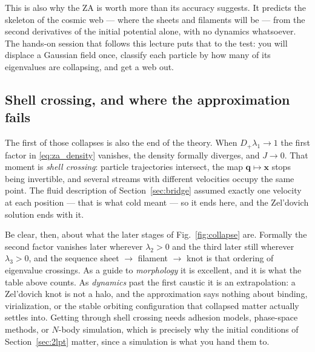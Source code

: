 \documentclass[a4paper,11pt]{article}
\newcommand{\vx}{\bm{x}}
\newcommand{\vq}{\bm{q}}
\numberwithin{equation}{section}
\begin{document}
This is also why the ZA is worth more than its accuracy suggests. It predicts the
skeleton of the cosmic web --- where the sheets and filaments will be --- from
the second derivatives of the initial potential alone, with no dynamics
whatsoever. The hands-on session that follows this lecture puts that to the test:
you will displace a Gaussian field once, classify each particle by how many of its
eigenvalues are collapsing, and get a web out.

\subsection{Shell crossing, and where the approximation fails}
\label{sec:shellcross}

The first of those collapses is also the end of the theory. When
$D_+\lambda_1 \to 1$ the first factor in \eqref{eq:za_density} vanishes, the
density formally diverges, and $J \to 0$. That moment is \emph{shell crossing}:
particle trajectories intersect, the map $\vq \mapsto \vx$ stops being
invertible, and several streams with different velocities occupy the same
point. The fluid description of Section~\ref{sec:bridge} assumed exactly one
velocity at each position --- that is what cold meant --- so it ends here, and
the Zel'dovich solution ends with it.

Be clear, then, about what the later stages of Fig.~\ref{fig:collapse} are.
Formally the second factor vanishes later wherever $\lambda_2>0$ and the third
later still wherever $\lambda_3>0$, and the sequence sheet $\rightarrow$ filament
$\rightarrow$ knot is that ordering of eigenvalue crossings. As a guide to
\emph{morphology} it is excellent, and it is what the table above counts. As
\emph{dynamics} past the first caustic it is an extrapolation: a Zel'dovich knot
is not a halo, and the approximation says nothing about binding, virialization,
or the stable orbiting configuration that collapsed matter actually settles into.
Getting through shell crossing needs adhesion models, phase-space methods, or
$N$-body simulation, which is precisely why the initial conditions of
Section~\ref{sec:2lpt} matter, since a simulation is what you hand them to.
\end{document}
